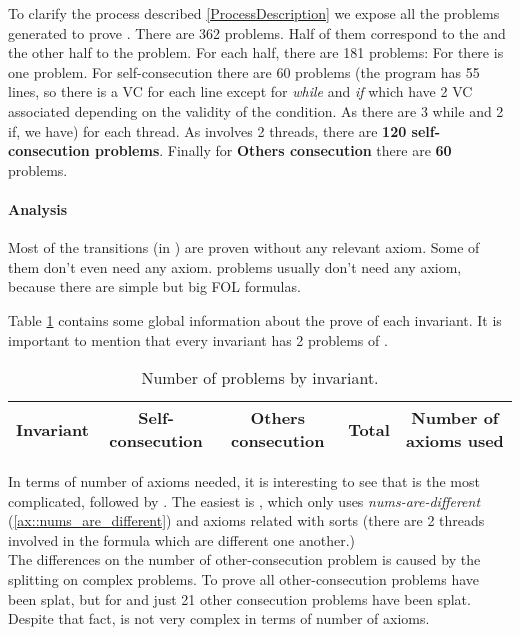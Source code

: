 To clarify the process described  \ref{ProcessDescription} we expose all the \spass problems generated to prove \invDisjoint.
%
There are 362 \spass problems. Half of them correspond to the \reducedProblem and the other half to the \smallToBig problem.
%
For each half, there are 181 \spass problems:
%
For \textbf{\instantiation} there is one problem. 
%
For self-consecution there are 60 \spass problems (the program has 55 lines, so there is a \gls{VC} for each line except for \textit{while} and \textit{if} which have 2 \gls{VC} associated depending on the validity of the condition. As there are 3 while and 2 if, we have) for each thread. 
%
As \invDisjoint involves 2 threads, there are \textbf{120 self-consecution \spass problems}.
%
Finally for \textbf{Others consecution} there are \textbf{60} \spass problems.

\paragraph{Analysis}

Most of the transitions (\numTransitionsProvedWithPC in \numTotalTransitions) are proven without any relevant axiom. 
%
Some of them don't even need any axiom. 
%
\smallToBig problems usually don't need any axiom, because there are simple but big \gls{FOL} formulas.

Table \ref{table:analysisProofs}  contains some global information about the prove of each invariant.
%
It is important to mention that every invariant has 2 problems of \instantiation. 

\begin{table}[hbtp]
\centering
\begin{tabular}{c|cccc}
Invariant & Self-consecution & Others consecution & Total & Number of axioms used\\\hline

\end{tabular}
\label{table:analysisProofs}
\caption{Number of \spass problems by invariant.}
\end{table}



In terms of number of axioms needed, it is interesting to see that \invLock is the most complicated, followed by \invNext.  
%
The easiest is \invDisjoint, which only uses \textit{nums-are-different} (\ref{ax::nums_are_different}) and axioms related with sorts (there are 2 threads involved in the formula which are different one another.)
\\
The differences on the number of other-consecution problem is caused by the splitting on complex \spass problems. 
%
To prove \invOrder all other-consecution problems have been splat, but for \invLock and \invNext just 21 other consecution problems have been splat.
%
Despite that fact, \invOrder is not very complex in terms of number of axioms. 


